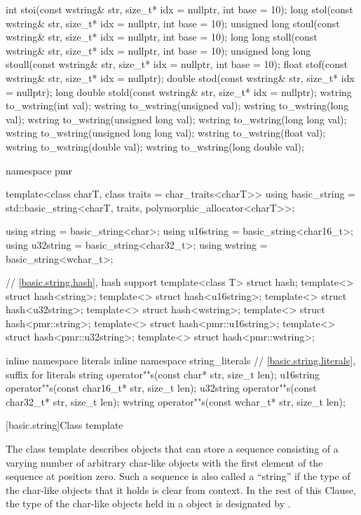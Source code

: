 \begin{codeblock}
{  int stoi(const wstring& str, size_t* idx = nullptr, int base = 10);
  long stol(const wstring& str, size_t* idx = nullptr, int base = 10);
  unsigned long stoul(const wstring& str, size_t* idx = nullptr, int base = 10);
  long long stoll(const wstring& str, size_t* idx = nullptr, int base = 10);
  unsigned long long stoull(const wstring& str, size_t* idx = nullptr, int base = 10);
  float stof(const wstring& str, size_t* idx = nullptr);
  double stod(const wstring& str, size_t* idx = nullptr);
  long double stold(const wstring& str, size_t* idx = nullptr);
  wstring to_wstring(int val);
  wstring to_wstring(unsigned val);
  wstring to_wstring(long val);
  wstring to_wstring(unsigned long val);
  wstring to_wstring(long long val);
  wstring to_wstring(unsigned long long val);
  wstring to_wstring(float val);
  wstring to_wstring(double val);
  wstring to_wstring(long double val);

  namespace pmr {
    template<class charT, class traits = char_traits<charT>>
      using basic_string = std::basic_string<charT, traits, polymorphic_allocator<charT>>;

    using string    = basic_string<char>;
    using u16string = basic_string<char16_t>;
    using u32string = basic_string<char32_t>;
    using wstring   = basic_string<wchar_t>;
  }

  // \ref{basic.string.hash}, hash support
  template<class T> struct hash;
  template<> struct hash<string>;
  template<> struct hash<u16string>;
  template<> struct hash<u32string>;
  template<> struct hash<wstring>;
  template<> struct hash<pmr::string>;
  template<> struct hash<pmr::u16string>;
  template<> struct hash<pmr::u32string>;
  template<> struct hash<pmr::wstring>;

  inline namespace literals {
  inline namespace string_literals {
    // \ref{basic.string.literals}, suffix for  literals
    string    operator""s(const char* str, size_t len);
    u16string operator""s(const char16_t* str, size_t len);
    u32string operator""s(const char32_t* str, size_t len);
    wstring   operator""s(const wchar_t* str, size_t len);
  }
  }
}
\end{codeblock}

[basic.string]{Class template }

\pnum
{}%
The
class template
describes objects that can store a sequence consisting of a varying number of
arbitrary char-like objects with the first element of the sequence at position zero.
Such a sequence is also called a ``string'' if the type of the
char-like objects that it holds
is clear from context.
In the rest of this Clause,
the type of the char-like objects held in a  object
is designated by .

